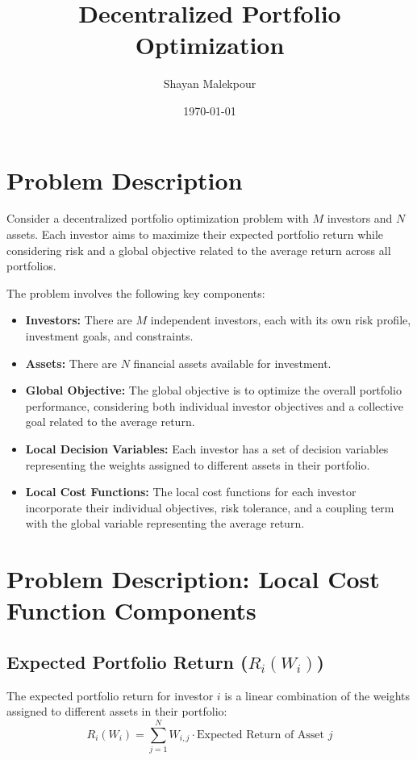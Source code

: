 \documentclass{article}
\begin{document}
	
	\title{Decentralized Portfolio Optimization}
	\author{Shayan Malekpour}
	\date{\today}
	\maketitle
	
	\section*{Problem Description}
	
	Consider a decentralized portfolio optimization problem with $M$ investors and $N$ assets. Each investor aims to maximize their expected portfolio return while considering risk and a global objective related to the average return across all portfolios.
	
	The problem involves the following key components:
	
	\begin{itemize}
		\item \textbf{Investors:} There are $M$ independent investors, each with its own risk profile, investment goals, and constraints.
		\item \textbf{Assets:} There are $N$ financial assets available for investment.
		\item \textbf{Global Objective:} The global objective is to optimize the overall portfolio performance, considering both individual investor objectives and a collective goal related to the average return.
		\item \textbf{Local Decision Variables:} Each investor has a set of decision variables representing the weights assigned to different assets in their portfolio.
		\item \textbf{Local Cost Functions:} The local cost functions for each investor incorporate their individual objectives, risk tolerance, and a coupling term with the global variable representing the average return.
	\end{itemize}
	
	\section*{Problem Description: Local Cost Function Components}
	
	\subsection*{Expected Portfolio Return ($R_i(W_i)$)}
	The expected portfolio return for investor $i$ is a linear combination of the weights assigned to different assets in their portfolio:
	\[ R_i(W_i) = \sum_{j=1}^{N} W_{i,j} \cdot \text{Expected Return of Asset } j \]
	
\end{document}
